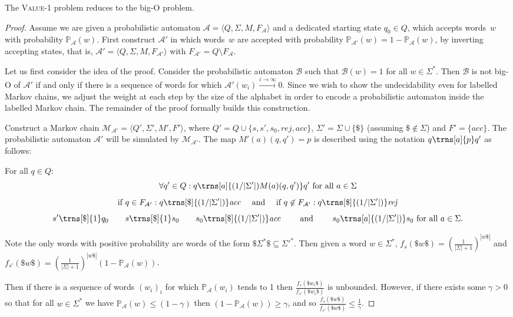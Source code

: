 \documentclass[10pt,a4paper]{amsart}
\numberwithin{equation}{section}
\theoremstyle{plain}
\theoremstyle{definition}
\theoremstyle{remark}
\newcommand\acc{\mathit{acc}}
\newcommand\rej{\mathit{rej}}
\newcommand\abra[1]{\langle #1 \rangle}
\newcommand\lmc{\mathcal{M}}
\newcommand\pr{\mathbb{P}}
\newcommand\pa{\mathcal{A}}
\renewcommand\nu{f}
\begin{document}
\begin{prop}\label{prop:v1tobigo}
The \textsc{Value-1} problem reduces to the big-O problem.
\end{prop}
\begin{proof} 

Assume we are given a probabilistic automaton $\pa = \abra{Q,\Sigma,M,F_{\pa}}$ and a dedicated starting state $q_0 \in Q$, which accepts words~$w$ with probability $\pr_\pa(w)$. First construct $\pa'$ in which words~$w$ are accepted with probability $\pr_{\pa'}(w) = 1 - \pr_\pa(w)$, by inverting accepting states, that is, $\pa' = \abra{Q,\Sigma,M,F_{\pa'}}$ with $F_{\pa'}= Q\setminus F_{\pa} $.

Let us first consider the idea of the proof. Consider the probabilistic automaton $\mathcal{B}$ such that $\mathcal{B}(w) = 1$ for all $w\in\Sigma^*$. Then $\mathcal{B}$ is not big-O of $\pa'$ if and only if there is a sequence of words for which $\pa'(w_i) \xrightarrow{i\to\infty} 0$. Since we wish to show the undecidability even for labelled Markov chains, we adjust the weight at each step by the size of the alphabet in order to encode a probabilistic automaton inside the labelled Markov chain. The remainder of the proof formally builds this construction.

Construct a Markov chain $ \lmc_{\pa'} = \abra{Q',\Sigma', M', F'}$, where $Q' =Q \cup \{s, s', s_0, \rej, \acc\}$, $\Sigma' = \Sigma \cup \{\$\}$ (assuming $\$\not\in\Sigma$) and $F' =\{\acc\}$. The probabilistic automaton $\pa'$ will be simulated by $\lmc_{\pa'}$. The map  $M'(a)(q,q')= p$ is described using the notation $q\trns[a]{p}q'$ as follows:

For all $q\in Q:$
\[
  \forall q' \in Q: q\trns[a]{(1/|\Sigma'|)M(a)(q,q')} q' \text{ for all } a\in \Sigma
\]
\[
\text{if }q \in F_{{\pa'}}: q\trns[\$]{(1/|\Sigma'|)} \acc \quad \text{ and }  \quad \text{if } q \not\in F_{{\pa'}}: q\trns[\$]{(1/|\Sigma'|)} \rej
\]
\[
  s' \trns[\$]{1} q_0 \quad\quad s \trns[\$]{1} s_0  \quad\quad s_0\trns[\$]{(1/|\Sigma'|)} \acc\quad\quad \text{ and }\quad\quad s_0\trns[a]{(1/|\Sigma'|)} s_0 \text{ for all } a\in \Sigma.
\]

Note the only words with positive probability are words of the form $\$ \Sigma^* \$ \subseteq \Sigma'^* $. Then given a word $w\in \Sigma^*$,
$\nu_s(\$ w\$) =\left(\frac{1}{|\Sigma| + 1}\right)^{|w\$|}$ and $\nu_{s'}(\$ w\$) = \left(\frac{1}{|\Sigma| + 1}\right)^{|w\$|}(1-\pr_\pa(w))$.

Then if there is a sequence of words $(w_i)_i$ for which $\pr_\pa(w_i)$ tends to 1 then $\frac{ \nu_s(\$w_i\$)}{ \nu_{s'}(\$w_i\$)} $ is unbounded. However, if there exists some $\gamma > 0$ so that for all $w \in \Sigma^*$ we have $  \pr_\pa(w) \le (1-\gamma)$ then $(1- \pr_\pa(w)) \ge \gamma$, and so $\frac{ \nu_s(\$w\$)}{ \nu_{s'}(\$w\$)}  \le \frac{1}{\gamma}$.
\end{proof}
\end{document}
